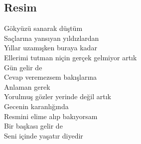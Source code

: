 \subsection{Resim}

Gökyüzü sanarak düştüm \\
Saçlarına yansıyan yıldızlardan \\
Yıllar uzamışken buraya kadar \\
Ellerimi tutman niçin gerçek gelmiyor artık \\

\noindent\newline
Gün gelir de \\
Cevap veremezsem bakışlarına \\
Anlaman gerek \\
Yorulmuş gözler yerinde değil artık \\

\noindent\newline
Gecenin karanlığında \\
Resmini elime alıp bakıyorsam \\
Bir başkası gelir de \\
Seni içinde yaşatır diyedir \\